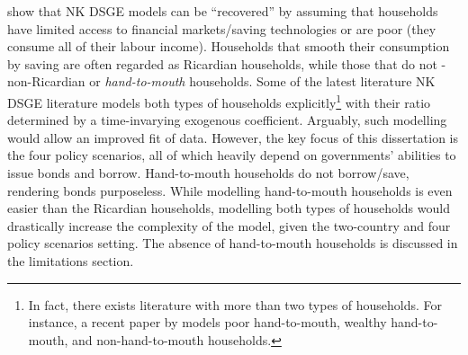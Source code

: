 \textcite{jordigal_2005_understanding} show that NK DSGE models can be ``recovered'' by assuming that households have limited access to financial markets/saving technologies or are poor (they consume all of their labour income). Households that smooth their consumption by saving are often regarded as Ricardian households, while those that do not - non-Ricardian or \textit{hand-to-mouth} households. Some of the latest literature NK DSGE literature models both types of households explicitly\footnote{In fact, there exists literature with more than two types of households. For instance, a recent paper by \textcite{eskelinen_2021_monetary} models poor hand-to-mouth, wealthy hand-to-mouth, and non-hand-to-mouth households.} with their ratio determined by a time-invarying exogenous coefficient. Arguably, such modelling would allow an improved fit of data. However, the key focus of this dissertation is the four policy scenarios, all of which heavily depend on governments' abilities to issue bonds and borrow. Hand-to-mouth households do not borrow/save, rendering bonds purposeless. While modelling hand-to-mouth households is even easier than the Ricardian households, modelling both types of households would drastically increase the complexity of the model, given the two-country and four policy scenarios setting. The absence of hand-to-mouth households is discussed in the limitations section.